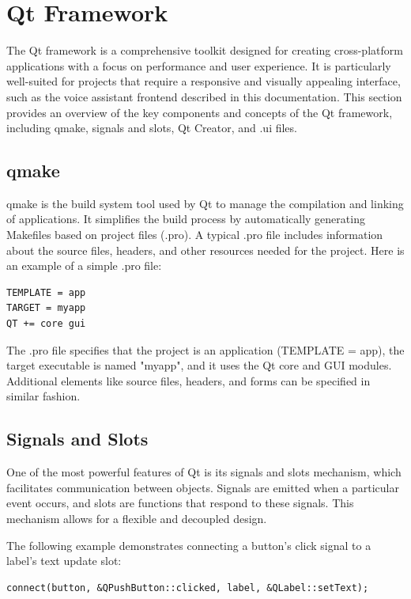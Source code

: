 \section{Qt Framework}
The Qt framework is a comprehensive toolkit designed for creating cross-platform applications with a focus on performance and user experience. It is particularly well-suited for projects that require a responsive and visually appealing interface, such as the voice assistant frontend described in this documentation. This section provides an overview of the key components and concepts of the Qt framework, including qmake, signals and slots, Qt Creator, and .ui files.

\subsection{qmake}
qmake is the build system tool used by Qt to manage the compilation and linking of applications. It simplifies the build process by automatically generating Makefiles based on project files (.pro). A typical .pro file includes information about the source files, headers, and other resources needed for the project. Here is an example of a simple .pro file:

\begin{verbatim}
TEMPLATE = app
TARGET = myapp
QT += core gui
\end{verbatim}

The .pro file specifies that the project is an application (TEMPLATE = app), the target executable is named "myapp", and it uses the Qt core and GUI modules. Additional elements like source files, headers, and forms can be specified in similar fashion.

\subsection{Signals and Slots}
One of the most powerful features of Qt is its signals and slots mechanism, which facilitates communication between objects. Signals are emitted when a particular event occurs, and slots are functions that respond to these signals. This mechanism allows for a flexible and decoupled design.

The following example demonstrates connecting a button's click signal to a label's text update slot:

\begin{verbatim}
connect(button, &QPushButton::clicked, label, &QLabel::setText);
\end{verbatim}

